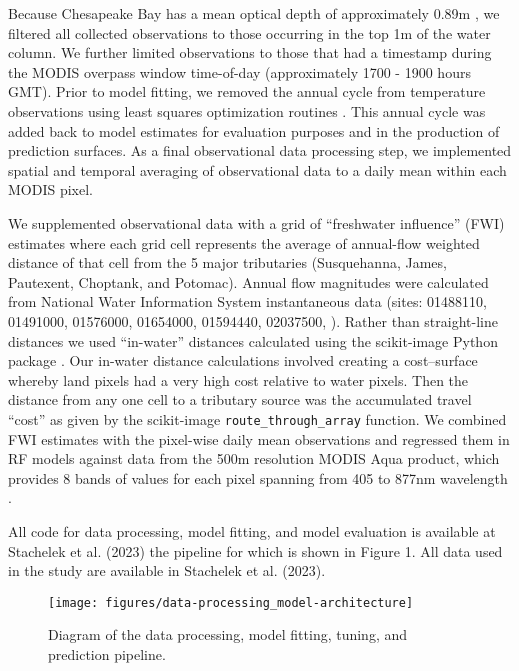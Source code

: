 \documentclass{article}
\begin{document}
Because Chesapeake Bay has a mean optical depth of approximately 0.89m \cite{urquhartRemotelySensedEstimates2012}, we filtered all collected observations to those occurring in the top 1m of the water column. We further limited observations to those that had a timestamp during the MODIS overpass window time-of-day (approximately 1700 - 1900 hours GMT). Prior to model fitting, we removed the annual cycle from temperature observations using least squares optimization routines \cite{virtanenSciPyFundamentalAlgorithms2020a}. This annual cycle was added back to model estimates for evaluation purposes and in the production of prediction surfaces. As a final observational data processing step, we implemented spatial and temporal averaging of observational data to a daily mean within each MODIS pixel. 

We supplemented observational data with a grid of “freshwater influence” (FWI) estimates where each grid cell represents the average of annual-flow weighted distance of that cell from the 5 major tributaries (Susquehanna, James, Pautexent, Choptank, and Potomac). Annual flow magnitudes were calculated from National Water Information System instantaneous data (sites: 01488110, 01491000, 01576000, 01654000, 01594440, 02037500, \cite{nwis2021usgs}). Rather than straight-line distances we used “in-water” distances calculated using the scikit-image Python package \cite{littleKrigingEstuariesCrow1997,vanderwaltScikitimageImageProcessing2014}. Our in-water distance calculations involved creating a cost–surface whereby land pixels had a very high cost relative to water pixels. Then the distance from any one cell to a tributary source was the accumulated travel “cost” as given by the scikit-image \texttt{route\_through\_array} function. We combined FWI estimates with the pixel-wise daily mean observations and regressed them in RF models against data from the 500m resolution MODIS Aqua product, which provides 8 bands of values for each pixel spanning from 405 to 877nm wavelength \cite{vermoteericMOD09GAMODISTerra2015}.

All code for data processing, model fitting, and model evaluation is available at Stachelek et al. (2023) the pipeline for which is shown in Figure 1. All data used in the study are available in Stachelek et al. (2023).

\begin{figure}[ht!]
    \begin{center}
          \texttt{[image: figures/data-processing\_model-architecture]}
          \caption{Diagram of the data processing, model fitting, tuning, and prediction pipeline.}
    \end{center}    
\end{figure}
\end{document}
